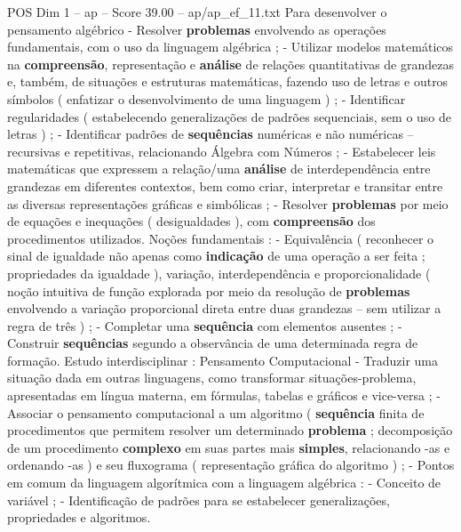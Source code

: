 \begin{textsample}{POS Dim 1 – ap – Score 39.00 – ap/ap\_ef\_11.txt}
Para desenvolver o pensamento algébrico - Resolver \textbf{problemas} envolvendo as operações fundamentais, com o uso da linguagem algébrica ; - Utilizar modelos matemáticos na \textbf{compreensão}, representação e \textbf{análise} de relações quantitativas de grandezas e, também, de situações e estruturas matemáticas, fazendo uso de letras e outros símbolos ( enfatizar o desenvolvimento de uma linguagem ) ; - Identificar regularidades ( estabelecendo generalizações de padrões sequenciais, sem o uso de letras ) ; - Identificar padrões de \textbf{sequências} numéricas e não numéricas – recursivas e repetitivas, relacionando Álgebra com Números ; - Estabelecer leis matemáticas que expressem a relação/uma \textbf{análise} de interdependência entre grandezas em diferentes contextos, bem como criar, interpretar e transitar entre as diversas representações gráficas e simbólicas ; - Resolver \textbf{problemas} por meio de equações e inequações ( desigualdades ), com \textbf{compreensão} dos procedimentos utilizados.
Noções fundamentais : - Equivalência ( reconhecer o sinal de igualdade não apenas como \textbf{indicação} de uma operação a ser feita ; propriedades da igualdade ), variação, interdependência e proporcionalidade ( noção intuitiva de função explorada por meio da resolução de \textbf{problemas} envolvendo a variação proporcional direta entre duas grandezas – sem utilizar a regra de três ) ; - Completar uma \textbf{sequência} com elementos ausentes ; - Construir \textbf{sequências} segundo a observância de uma determinada regra de formação.
Estudo interdisciplinar : Pensamento Computacional - Traduzir uma situação dada em outras linguagens, como transformar situações-problema, apresentadas em língua materna, em fórmulas, tabelas e gráficos e vice-versa ; - Associar o pensamento computacional a um algoritmo ( \textbf{sequência} finita de procedimentos que permitem resolver um determinado \textbf{problema} ; decomposição de um procedimento \textbf{complexo} em suas partes mais \textbf{simples}, relacionando -as e ordenando -as ) e seu fluxograma ( representação gráfica do algoritmo ) ; - Pontos em comum da linguagem algorítmica com a linguagem algébrica : - Conceito de variável ; - Identificação de padrões para se estabelecer generalizações, propriedades e algoritmos.

\end{textsample}
